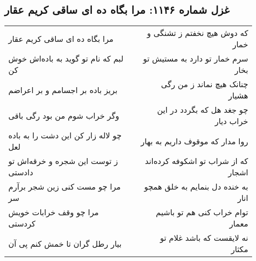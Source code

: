 \begin{center}
\section*{غزل شماره ۱۱۴۶: مرا بگاه ده ای ساقی کریم عقار}
\label{sec:1146}
\begin{longtable}{l p{0.5cm} r}
مرا بگاه ده ای ساقی کریم عقار
&&
که دوش هیچ نخفتم ز تشنگی و خمار
\\
لبم که نام تو گوید به باده‌اش خوش کن
&&
سرم خمار تو دارد به مستیش تو بخار
\\
بریز باده بر اجسامم و بر اعراضم
&&
چنانک هیچ نماند ز من رگی هشیار
\\
وگر خراب شوم من بود رگی باقی
&&
چو جغد هل که بگردد در این خراب دیار
\\
چو لاله زار کن این دشت را به باده لعل
&&
روا مدار که موقوف داریم به بهار
\\
ز توست این شجره و خرقه‌اش تو دادستی
&&
که از شراب تو اشکوفه کرده‌اند اشجار
\\
مرا چو مست کنی زین شجر برآرم سر
&&
به خنده دل بنمایم به خلق همچو انار
\\
مرا چو وقف خرابات خویش کردستی
&&
توام خراب کنی هم تو باشیم معمار
\\
بیار رطل گران تا خمش کنم پی آن
&&
نه لایقست که باشد غلام تو مکثار
\\
\end{longtable}
\end{center}
